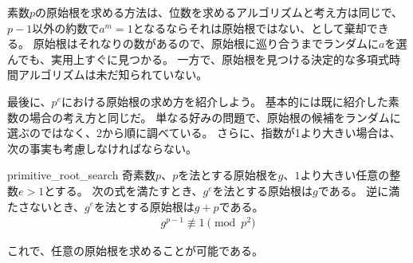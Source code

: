 素数$p$の原始根を求める方法は、位数を求めるアルゴリズムと考え方は同じで、$p-1$以外の約数で$a^{m}=1$となるならそれは原始根ではない、として棄却できる。
原始根はそれなりの数があるので、原始根に巡り合うまでランダムに$a$を選んでも、実用上すぐに見つかる。
一方で、原始根を見つける決定的な多項式時間アルゴリズムは未だ知られていない。

最後に、$p^e$における原始根の求め方を紹介しよう。
基本的には既に紹介した素数の場合の考え方と同じだ。
単なる好みの問題で、原始根の候補をランダムに選ぶのではなく、2から順に調べている。
さらに、指数が1より大きい場合は、次の事実も考慮しなければならない。

\begin{Prop}{}{primitive_root_search}
奇素数$p$、$p$を法とする原始根を$g$、$1$より大きい任意の整数$e>1$とする。
次の式を満たすとき、$g^e$を法とする原始根は$g$である。
逆に満たさないとき、$g^e$を法とする原始根は$g+p$である。
\begin{align*}
g^{p-1} \not\equiv 1 \pmod{p^2}
\end{align*}
\end{Prop}

これで、任意の原始根を求めることが可能である。

